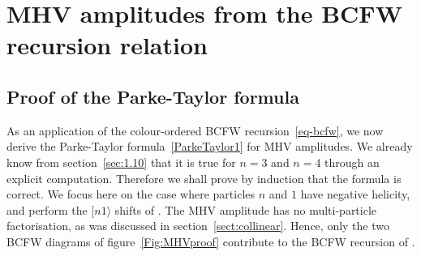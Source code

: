 \section{MHV amplitudes from the BCFW recursion relation}
\label{sect:MHVfrom BCFW}

\subsection{Proof of the Parke-Taylor formula}

As an application of the colour-ordered BCFW recursion~\eqref{eq-bcfw}, we  now derive  the   Parke-Taylor formula~\eqref{ParkeTaylor1} for MHV amplitudes.  
We already know from  section~\ref{sec:1.10} that it  is true for $n=3$ and $n=4$ through an explicit computation.
Therefore we shall prove by induction that the formula is correct. 
We focus here on the case where particles $n$ and $1$ have negative helicity, and 
perform  the $[n1\rangle$ shifts of . The MHV amplitude has no multi-particle factorisation, as was discussed in section~\ref{sect:collinear}. Hence, only the two BCFW diagrams of
figure~\ref{Fig:MHVproof} contribute to the BCFW recursion of .
%
